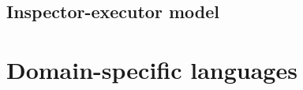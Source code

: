 \documentclass[thesis]{subfiles}
\begin{document}
\subsection{Inspector-executor model}
\cite{knepleyExascaleComputingThreads2015} %

\cite{stroutSparsePolyhedralFramework2018} %
\cite{mirchandaneyPrinciplesRuntimeSupport1988} %
\cite{arenazInspectorExecutorAlgorithmIrregular2004} %





\section{Domain-specific languages}  %


\end{document}
